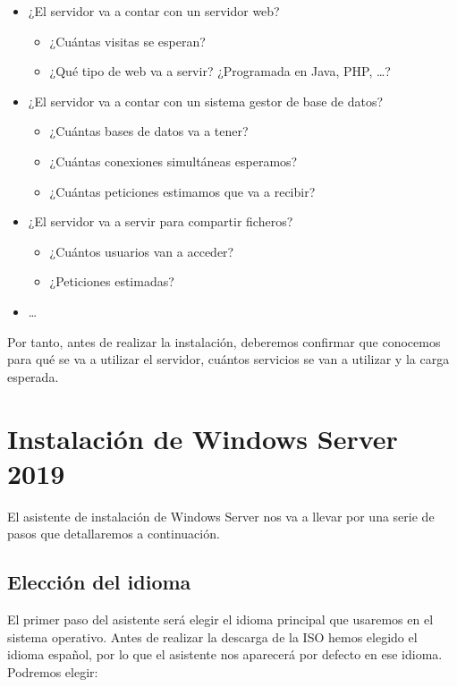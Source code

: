 \begin{itemize}
    \item ¿El servidor va a contar con un servidor web?
    \begin{itemize}
        \item ¿Cuántas visitas se esperan?
        \item ¿Qué tipo de web va a servir? ¿Programada en Java, PHP, …?
    \end{itemize}
    \item ¿El servidor va a contar con un sistema gestor de base de datos?
    \begin{itemize}
        \item ¿Cuántas bases de datos va a tener?
        \item ¿Cuántas conexiones simultáneas esperamos?
        \item ¿Cuántas peticiones estimamos que va a recibir?
    \end{itemize}
    \item ¿El servidor va a servir para compartir ficheros?
    \begin{itemize}
        \item ¿Cuántos usuarios van a acceder?
        \item ¿Peticiones estimadas?
    \end{itemize}
    \item …
\end{itemize}

Por tanto, antes de realizar la instalación, deberemos confirmar que conocemos para qué se va a utilizar el servidor, cuántos servicios se van a utilizar y la carga esperada.

\hypertarget{instalar_windows_server}{}
\section{Instalación de Windows Server 2019}
El asistente de instalación de Windows Server nos va a llevar por una serie de pasos que detallaremos a continuación.

\subsection{Elección del idioma}

El primer paso del asistente será elegir el idioma principal que usaremos en el sistema operativo.
Antes de realizar la descarga de la ISO hemos elegido el idioma español, por lo que el asistente nos aparecerá por defecto en ese idioma. Podremos elegir:

